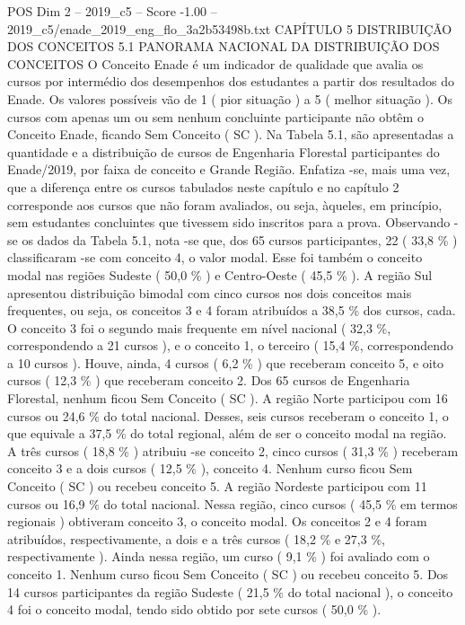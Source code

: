 \begin{textsample}{POS Dim 2 – 2019\_c5 – Score -1.00 – 2019\_c5/enade\_2019\_eng\_flo\_3a2b53498b.txt}  \label{ex:f2_pos_335}
CAPÍTULO 5 DISTRIBUIÇÃO DOS CONCEITOS 5.1 PANORAMA NACIONAL DA DISTRIBUIÇÃO DOS CONCEITOS O Conceito Enade é um indicador de qualidade que avalia os cursos por intermédio dos desempenhos dos estudantes a partir dos resultados do Enade.
Os valores possíveis vão de 1 ( pior situação ) a 5 ( melhor situação ).
Os cursos com apenas um ou sem nenhum concluinte participante não obtêm o Conceito Enade, ficando Sem Conceito ( SC ).
Na Tabela 5.1, são apresentadas a quantidade e a distribuição de cursos de Engenharia Florestal participantes do Enade/2019, por faixa de conceito e Grande Região.
Enfatiza -se, mais uma vez, que a diferença entre os cursos tabulados neste capítulo e no capítulo 2 corresponde aos cursos que não foram avaliados, ou seja, àqueles, em princípio, sem estudantes concluintes que tivessem sido inscritos para a prova.
Observando -se os dados da Tabela 5.1, nota -se que, dos 65 cursos participantes, 22 ( 33,8 \% ) classificaram -se com conceito 4, o valor modal.
Esse foi também o conceito modal nas regiões Sudeste ( 50,0 \% ) e Centro-Oeste ( 45,5 \% ).
A região Sul apresentou distribuição bimodal com cinco cursos nos dois conceitos mais frequentes, ou seja, os conceitos 3 e 4 foram atribuídos a 38,5 \% dos cursos, cada.
O conceito 3 foi o segundo mais frequente em nível nacional ( 32,3 \%, correspondendo a 21 cursos ), e o conceito 1, o terceiro ( 15,4 \%, correspondendo a 10 cursos ).
Houve, ainda, 4 cursos ( 6,2 \% ) que receberam conceito 5, e oito cursos ( 12,3 \% ) que receberam conceito 2.
Dos 65 cursos de Engenharia Florestal, nenhum ficou Sem Conceito ( SC ).
A região Norte participou com 16 cursos ou 24,6 \% do total nacional.
Desses, seis cursos receberam o conceito 1, o que equivale a 37,5 \% do total regional, além de ser o conceito modal na região.
A três cursos ( 18,8 \% ) atribuiu -se conceito 2, cinco cursos ( 31,3 \% ) receberam conceito 3 e a dois cursos ( 12,5 \% ), conceito 4.
Nenhum curso ficou Sem Conceito ( SC ) ou recebeu conceito 5.
A região Nordeste participou com 11 cursos ou 16,9 \% do total nacional.
Nessa região, cinco cursos ( 45,5 \% em termos regionais ) obtiveram conceito 3, o conceito modal.
Os conceitos 2 e 4 foram atribuídos, respectivamente, a dois e a três cursos ( 18,2 \% e 27,3 \%, respectivamente ).
Ainda nessa região, um curso ( 9,1 \% ) foi avaliado com o conceito 1.
Nenhum curso ficou Sem Conceito ( SC ) ou recebeu conceito 5.
Dos 14 cursos participantes da região Sudeste ( 21,5 \% do total nacional ), o conceito 4 foi o conceito modal, tendo sido obtido por sete cursos ( 50,0 \% ).

\end{textsample}
